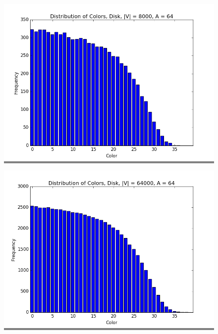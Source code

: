 \documentclass{article}
\begin{document}
\begin{figure}
    \begin{minipage}{0.45\textwidth}
    \colorbox{gray}{\includegraphics[width=\linewidth]{./graphs/hist_colors_disk_0.png}}
    \end{minipage}
    \hspace{\fill}
    \begin{minipage}{0.45\textwidth}
    \colorbox{gray}{\includegraphics[width=\linewidth]{./graphs/hist_colors_disk_1.png}}
    \end{minipage}
    \vskip 0.25in
    \begin{minipage}{0.45\textwidth}

\end{minipage}
\end{figure}
\end{document}

